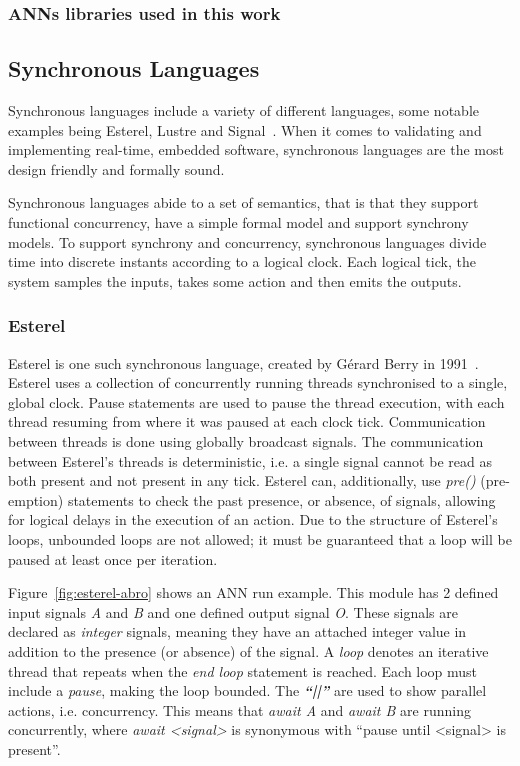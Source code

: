 \subsubsection{\acfp{ANN} libraries used in this work}


\subsection{Synchronous Languages}
Synchronous languages include a variety of different languages, some notable examples being Esterel, Lustre and Signal~\cite{benveniste2003synchronous}.
When it comes to validating and implementing real-time, embedded software, synchronous languages are the most design friendly and formally sound.

Synchronous languages abide to a set of semantics, that is that they support functional concurrency, have a simple formal model and support synchrony models.
To support synchrony and concurrency, synchronous languages divide time into discrete instants according to a logical clock.
Each logical tick, the system samples the inputs, takes some action and then emits the outputs.

\subsubsection{Esterel}
Esterel is one such synchronous language, created by Gérard Berry in 1991~\cite{berry1991}. 
Esterel uses a collection of concurrently running threads synchronised to a single, global clock.
Pause statements are used to pause the thread execution, with each thread resuming from where it was paused at each clock tick.
Communication between threads is done using globally broadcast signals.
The communication between Esterel's threads is deterministic, i.e. a single signal cannot be read as both present and not present in any tick.
Esterel can, additionally, use \textit{pre()} (pre-emption) statements to check the past presence, or absence, of signals, allowing for logical delays in the execution of an action.
Due to the structure of Esterel's loops, unbounded loops are not allowed; it must be guaranteed that a loop will be paused at least once per iteration.

Figure~\ref{fig:esterel-abro} shows an \ac{ANN} run example.
This module has 2 defined input signals \textit{A} and \textit{B} and one defined output signal \textit{O}.
These signals are declared as \textit{integer} signals, meaning they have an attached integer value in addition to the presence (or absence) of the signal.
A \textit{loop} denotes an iterative thread that repeats when the \textit{end loop} statement is reached.
Each loop must include a \textit{pause}, making the loop bounded. 
The \textbf{\emph{``||''}} are used to show parallel actions, i.e. concurrency.
This means that \textit{await A} and \textit{await B} are running concurrently, where \textit{await <signal>} is synonymous with ``pause until <signal> is present''.

